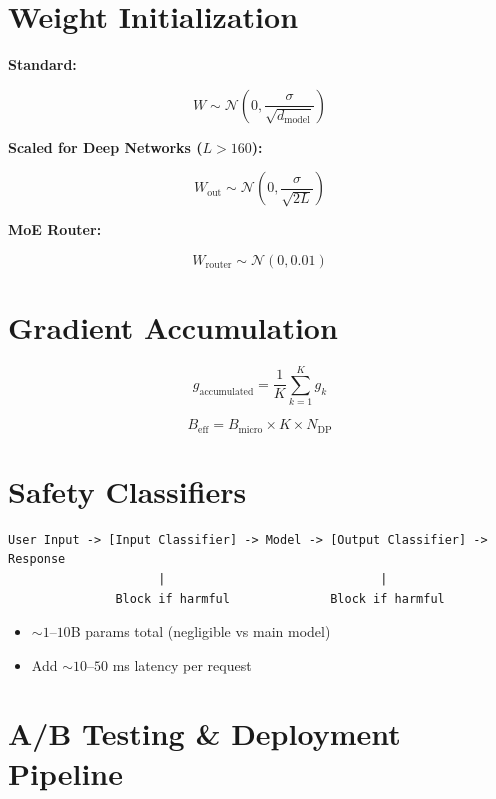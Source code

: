 \documentclass[11pt,a4paper]{article}
\begin{document}
\section{Weight Initialization}

\textbf{Standard:}

$$W \sim \mathcal{N}\!\left(0, \frac{\sigma}{\sqrt{d_{\text{model}}}}\right)$$

\textbf{Scaled for Deep Networks ($L > 160$):}

$$W_{\text{out}} \sim \mathcal{N}\!\left(0, \frac{\sigma}{\sqrt{2L}}\right)$$

\textbf{MoE Router:}

$$W_{\text{router}} \sim \mathcal{N}(0, 0.01)$$

\section{Gradient Accumulation}

$$g_{\text{accumulated}} = \frac{1}{K}\sum_{k=1}^{K} g_k$$

$$B_{\text{eff}} = B_{\text{micro}} \times K \times N_{\text{DP}}$$

\section{Safety Classifiers}

\begin{lstlisting}
User Input -> [Input Classifier] -> Model -> [Output Classifier] -> Response
                     |                              |
               Block if harmful              Block if harmful
\end{lstlisting}

\begin{itemize}
  \item $\sim 1\text{--}10$B params total (negligible vs main model)
  \item Add $\sim 10\text{--}50$ ms latency per request
\end{itemize}

\section{A/B Testing \& Deployment Pipeline}
\end{document}

